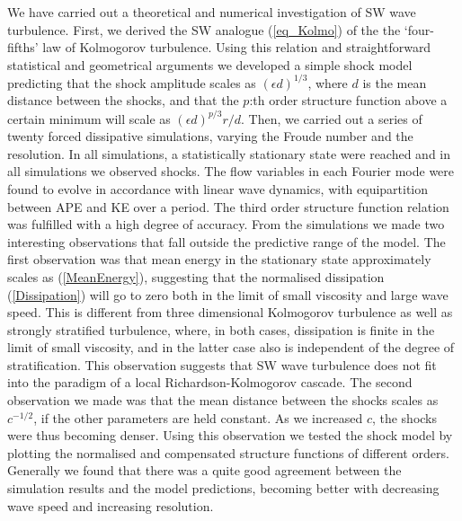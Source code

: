 \documentclass{jfm}
\begin{document}
We have carried out a theoretical and numerical investigation of SW wave
turbulence. First, we derived the SW analogue (\ref{eq_Kolmo}) of the the
`four-fifths' law of Kolmogorov turbulence. Using this relation and
straightforward statistical and geometrical arguments we developed a simple
shock model predicting that the shock amplitude scales as $ (\epsilon d)^{1/3}
$, where $ d $ is the mean distance between the shocks, and that the $ p $:th
order structure function above a certain minimum will scale as $ (\epsilon
d)^{p/3} r/d $. Then, we carried out a series of twenty forced dissipative
simulations, varying the Froude number and the resolution. In all simulations,
a statistically stationary state were reached and in all simulations we
observed shocks. The flow variables in each Fourier mode were found to evolve
in accordance with linear wave dynamics, with equipartition between APE and KE
over a period. The third order structure function relation was fulfilled with a
high degree of accuracy. From the simulations we made two interesting
observations that fall outside the predictive range of the model. The first
observation was that mean energy in the stationary state approximately scales
as (\ref{MeanEnergy}), suggesting that the normalised dissipation
(\ref{Dissipation}) will go to zero both in the limit of small viscosity and
large wave speed. This is different from three dimensional Kolmogorov
turbulence as well as strongly stratified turbulence, where, in both cases,
dissipation is finite in the limit of small viscosity, and in the latter case
also is independent of the degree of stratification. This observation suggests
that SW wave turbulence does not fit into the paradigm of a local
Richardson-Kolmogorov cascade. The second observation we made was that the mean
distance between the shocks scales as $ c^{-1/2} $, if the other parameters are
held constant. As we increased $ c $, the shocks were thus becoming denser.
Using this observation we tested the shock model by plotting the normalised and
compensated structure functions of different orders. Generally we found that
there was a quite good agreement between the simulation results and the model
predictions, becoming better with decreasing wave speed and increasing
resolution.
\end{document}
